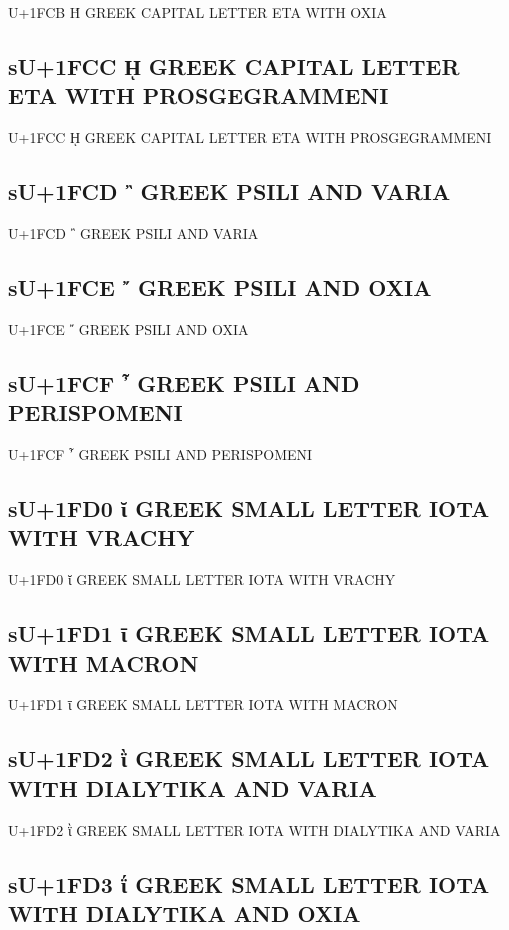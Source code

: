 U+1FCB Ή GREEK CAPITAL LETTER ETA WITH OXIA

\subsection{sU+1FCC ῌ GREEK CAPITAL LETTER ETA WITH PROSGEGRAMMENI}

U+1FCC ῌ GREEK CAPITAL LETTER ETA WITH PROSGEGRAMMENI

\subsection{sU+1FCD ῍ GREEK PSILI AND VARIA}

U+1FCD ῍ GREEK PSILI AND VARIA

\subsection{sU+1FCE ῎ GREEK PSILI AND OXIA}

U+1FCE ῎ GREEK PSILI AND OXIA

\subsection{sU+1FCF ῏ GREEK PSILI AND PERISPOMENI}

U+1FCF ῏ GREEK PSILI AND PERISPOMENI

\subsection{sU+1FD0 ῐ GREEK SMALL LETTER IOTA WITH VRACHY}

U+1FD0 ῐ GREEK SMALL LETTER IOTA WITH VRACHY

\subsection{sU+1FD1 ῑ GREEK SMALL LETTER IOTA WITH MACRON}

U+1FD1 ῑ GREEK SMALL LETTER IOTA WITH MACRON

\subsection{sU+1FD2 ῒ GREEK SMALL LETTER IOTA WITH DIALYTIKA AND VARIA}

U+1FD2 ῒ GREEK SMALL LETTER IOTA WITH DIALYTIKA AND VARIA

\subsection{sU+1FD3 ΐ GREEK SMALL LETTER IOTA WITH DIALYTIKA AND OXIA}

